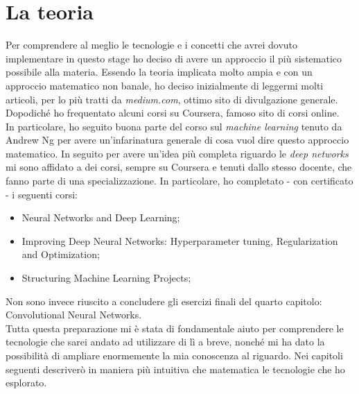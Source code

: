 
\chapter{La teoria}
\label{cap:teoria}
Per comprendere al meglio le tecnologie e i concetti che avrei dovuto implementare in questo stage ho deciso di avere un approccio il più sistematico possibile alla materia. Essendo la teoria implicata molto ampia e con un approccio matematico non banale, ho deciso inizialmente di leggermi molti articoli, per lo più tratti da \textit{medium.com}\cite{site:medium}, ottimo sito di divulgazione generale. Dopodiché ho frequentato alcuni corsi su Coursera\cite{site:coursera}, famoso sito di corsi online.
\medskip
\\In particolare, ho seguito buona parte del corso sul \textit{machine learning}\cite{course:machine-learning} tenuto da Andrew Ng\cite{person:andrew-ng} per avere un'infarinatura generale di cosa vuol dire questo approccio matematico. In seguito per avere un'idea più completa riguardo le \textit{deep networks} mi sono affidato a dei corsi, sempre su Coursera\cite{site:coursera} e tenuti dallo stesso docente, che fanno parte di una specializzazione\cite{course:deep-learning-specialization}. In particolare, ho completato - con certificato - i seguenti corsi:
\begin{itemize}
	\item Neural Networks and Deep Learning\cite{course:neural-networks-deep-learning};
	\item Improving Deep Neural Networks: Hyperparameter tuning, Regularization and Optimization\cite{course:improving-nn};
	\item Structuring Machine Learning Projects\cite{course:structuring-ml-proj};
\end{itemize}
Non sono invece riuscito a concludere gli esercizi finali del quarto capitolo: Convolutional Neural Networks\cite{course:cnn}.
\medskip
\\Tutta questa preparazione mi è stata di fondamentale aiuto per comprendere le tecnologie che sarei andato ad utilizzare di lì a breve, nonché mi ha dato la possibilità di ampliare enormemente la mia conoscenza al riguardo. Nei capitoli seguenti descriverò in maniera più intuitiva che matematica le tecnologie che ho esplorato.


